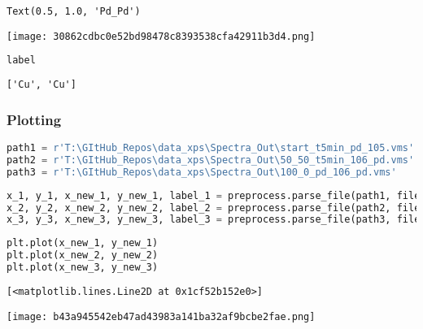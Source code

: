 \begin{lstlisting}
Text(0.5, 1.0, 'Pd_Pd')
\end{lstlisting}

\texttt{[image: 30862cdbc0e52bd98478c8393538cfa42911b3d4.png]}

\begin{lstlisting}[language=Python]
label
\end{lstlisting}

\begin{lstlisting}
['Cu', 'Cu']
\end{lstlisting}

\hypertarget{plotting}{%
\subsubsection{Plotting}\label{plotting}}

\begin{lstlisting}[language=Python]
path1 = r'T:\GItHub_Repos\data_xps\Spectra_Out\start_t5min_pd_105.vms' # only palladium visible
path2 = r'T:\GItHub_Repos\data_xps\Spectra_Out\50_50_t5min_106_pd.vms'
path3 = r'T:\GItHub_Repos\data_xps\Spectra_Out\100_0_pd_106_pd.vms'
\end{lstlisting}

\begin{lstlisting}[language=Python]
x_1, y_1, x_new_1, y_new_1, label_1 = preprocess.parse_file(path1, filetype='vms', scale=True, N_points=1024)
x_2, y_2, x_new_2, y_new_2, label_2 = preprocess.parse_file(path2, filetype='vms', scale=True, N_points=1024)
x_3, y_3, x_new_3, y_new_3, label_3 = preprocess.parse_file(path3, filetype='vms', scale=True, N_points=1024)
\end{lstlisting}

\begin{lstlisting}[language=Python]
plt.plot(x_new_1, y_new_1)
plt.plot(x_new_2, y_new_2)
plt.plot(x_new_3, y_new_3)
\end{lstlisting}

\begin{lstlisting}
[<matplotlib.lines.Line2D at 0x1cf52b152e0>]
\end{lstlisting}

\texttt{[image: b43a945542eb47ad43983a141ba32af9bcbe2fae.png]}
